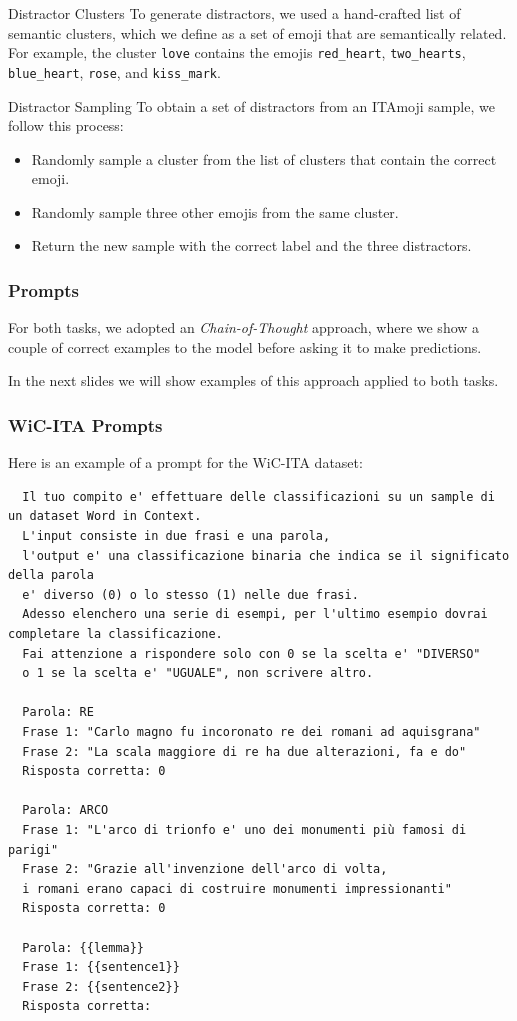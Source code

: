 \documentclass[english, xcolor={table,usenames}]{beamer}
\begin{document}
\begin{frame}{Distractor Clusters}
  To generate distractors, we used a hand-crafted list of \alert{semantic clusters}, which we define as
  a set of emoji that are semantically related. For example, the cluster \texttt{love} contains the
  emojis \texttt{red\_heart}, \texttt{two\_hearts}, \texttt{blue\_heart}, \texttt{rose}, and \texttt{kiss\_mark}.

\end{frame}

\begin{frame}{Distractor Sampling}
  To obtain a set of distractors from an ITAmoji sample, we follow this process:

  \begin{itemize}
    \item<1-> Randomly sample a cluster from the list of clusters that contain the correct emoji.
    \item<2-> Randomly sample three other emojis from the same cluster.
    \item<3-> Return the new sample with the correct label and the three distractors.
  \end{itemize}
\end{frame}


\begin{frame}[fragile]
  \frametitle{Prompts}
  For both tasks, we adopted an \emph{Chain-of-Thought} approach, where we show a couple of
  correct examples to the model before asking it to make predictions.

  In the next slides we will show examples of this approach applied to both tasks.
\end{frame}


\begin{frame}[fragile]
  \frametitle{WiC-ITA Prompts}

  Here is an example of a prompt for the WiC-ITA dataset:

  \tiny\begin{verbatim}
  Il tuo compito e' effettuare delle classificazioni su un sample di un dataset Word in Context.
  L'input consiste in due frasi e una parola, 
  l'output e' una classificazione binaria che indica se il significato della parola 
  e' diverso (0) o lo stesso (1) nelle due frasi.
  Adesso elenchero una serie di esempi, per l'ultimo esempio dovrai completare la classificazione.
  Fai attenzione a rispondere solo con 0 se la scelta e' "DIVERSO" 
  o 1 se la scelta e' "UGUALE", non scrivere altro. 
  
  Parola: RE
  Frase 1: "Carlo magno fu incoronato re dei romani ad aquisgrana"
  Frase 2: "La scala maggiore di re ha due alterazioni, fa e do"
  Risposta corretta: 0
  
  Parola: ARCO
  Frase 1: "L'arco di trionfo e' uno dei monumenti più famosi di parigi"
  Frase 2: "Grazie all'invenzione dell'arco di volta, 
  i romani erano capaci di costruire monumenti impressionanti"
  Risposta corretta: 0

  Parola: {{lemma}}
  Frase 1: {{sentence1}}
  Frase 2: {{sentence2}}
  Risposta corretta:
\end{verbatim}
\end{frame}
\end{document}
